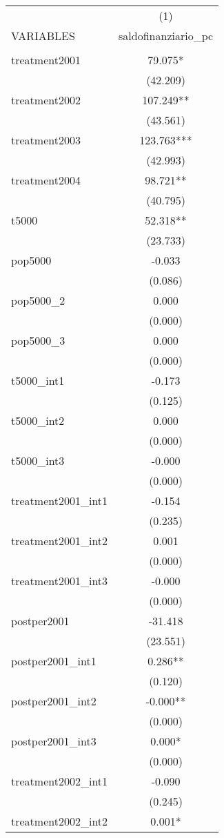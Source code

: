\documentclass[]{article}
\begin{document}
\begin{tabular}{lc} \hline
 & (1) \\
VARIABLES & saldofinanziario\_pc \\ \hline
 &  \\
treatment2001 & 79.075* \\
 & (42.209) \\
treatment2002 & 107.249** \\
 & (43.561) \\
treatment2003 & 123.763*** \\
 & (42.993) \\
treatment2004 & 98.721** \\
 & (40.795) \\
t5000 & 52.318** \\
 & (23.733) \\
pop5000 & -0.033 \\
 & (0.086) \\
pop5000\_2 & 0.000 \\
 & (0.000) \\
pop5000\_3 & 0.000 \\
 & (0.000) \\
t5000\_int1 & -0.173 \\
 & (0.125) \\
t5000\_int2 & 0.000 \\
 & (0.000) \\
t5000\_int3 & -0.000 \\
 & (0.000) \\
treatment2001\_int1 & -0.154 \\
 & (0.235) \\
treatment2001\_int2 & 0.001 \\
 & (0.000) \\
treatment2001\_int3 & -0.000 \\
 & (0.000) \\
postper2001 & -31.418 \\
 & (23.551) \\
postper2001\_int1 & 0.286** \\
 & (0.120) \\
postper2001\_int2 & -0.000** \\
 & (0.000) \\
postper2001\_int3 & 0.000* \\
 & (0.000) \\
treatment2002\_int1 & -0.090 \\
 & (0.245) \\
treatment2002\_int2 & 0.001* \\

\end{tabular}
\end{document}
